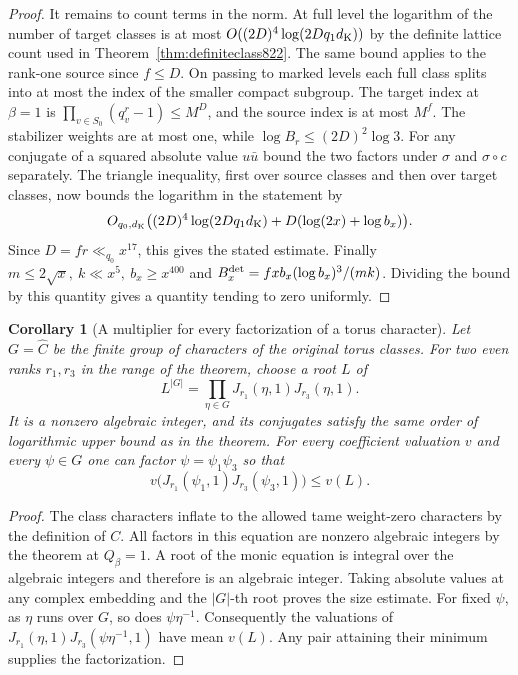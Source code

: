 \documentclass[a4paper,11pt]{article}
\newtheorem{corollary}[proposition]{Corollary}
\theoremstyle{definition}
\theoremstyle{remark}
\numberwithin{equation}{section}
\begin{document}
\begin{proof}
It remains to count terms in the norm. At full level
the logarithm of the number of target classes is at most
\(O((2D)^4\log(2Dq_1d_{\rm K}))\) by the definite lattice
count used in Theorem~\ref{thm:definiteclass822}. The same
bound applies to the rank-one source since \(f\le D\).
On passing to marked levels each full class splits into at
most the index of the smaller compact subgroup. The target
index at \(\beta=1\) is \(\prod_{v\in S_0}(q_v^r-1)\le M^D\),
and the source index is at most \(M^f\). The stabilizer
weights are at most one, while \(\log B_r\le(2D)^2\log3\).
For any conjugate of a squared absolute value \(u\bar u\)
bound the two factors under \(\sigma\) and \(\sigma\circ c\)
separately. The triangle inequality, first over source
classes and then over target classes, now bounds the
logarithm in the statement by
\[
 O_{q_0,d_{\rm K}}\bigl((2D)^4\log(2Dq_1d_{\rm K})
                     +D(\log(2x)+\log b_x)\bigr).
\]
Since \(D=fr\ll_{q_0}x^{17}\), this gives the stated estimate.
Finally \(m\le2\sqrt x,\ k\ll x^5,\ b_x\ge x^{400}\) and
\(B_x^{\rm det}=fxb_x(\log b_x)^3/(mk)\). Dividing the bound
by this quantity gives a quantity tending to zero uniformly.
\end{proof}

\begin{corollary}[A multiplier for every factorization of a torus character]
\leavevmode\label{cor:flatmean853}
Let \(G=\widehat C\) be the finite group of characters of the
original torus classes. For two even ranks \(r_1,r_3\) in the
range of the theorem, choose a root \(L\) of
\[
        L^{|G|}=\prod_{\eta\in G}J_{r_1}(\eta,1)J_{r_3}(\eta,1).
\]
It is a nonzero algebraic integer, and its conjugates satisfy
the same order of logarithmic upper bound as in the theorem.
For every coefficient valuation \(v\) and every \(\psi\in G\)
one can factor \(\psi=\psi_1\psi_3\) so that
\[
           v\bigl(J_{r_1}(\psi_1,1)J_{r_3}(\psi_3,1)\bigr)\le v(L).
\]
\end{corollary}
\begin{proof}
The class characters inflate to the allowed tame weight-zero
characters by the definition of \(C\). All factors in this
equation are nonzero algebraic integers by the theorem at
\(Q_\beta=1\). A root of the monic equation is integral over
the algebraic integers and therefore is an algebraic integer.
Taking absolute values at any complex embedding and the
\(|G|\)-th root proves the size estimate. For fixed \(\psi\),
as \(\eta\) runs over \(G\), so does \(\psi\eta^{-1}\).
Consequently the valuations of
\(J_{r_1}(\eta,1)J_{r_3}(\psi\eta^{-1},1)\) have mean \(v(L)\).
Any pair attaining their minimum supplies the factorization.
\end{proof}
\clearpage
\end{document}
